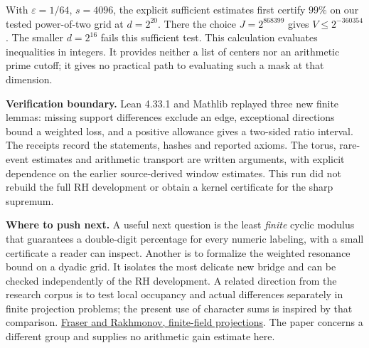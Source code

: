 \documentclass[12pt,letterpaper]{article}
\newcommand{\para}[1]{\par\medskip\noindent\textbf{#1}\quad}
\begin{document}
With \(\varepsilon=1/64\), \(s=4096\), the explicit sufficient estimates first certify \(99\%\) on our tested power-of-two grid at \(d=2^{20}\). There the choice \(J=2^{868399}\) gives \(V\le2^{-360354}\). The smaller \(d=2^{16}\) fails this sufficient test. This calculation evaluates inequalities in integers. It provides neither a list of centers nor an arithmetic prime cutoff; it gives no practical path to evaluating such a mask at that dimension.

\para{Verification boundary.} Lean 4.33.1 and Mathlib replayed three new finite lemmas: missing support differences exclude an edge, exceptional directions bound a weighted loss, and a positive allowance gives a two-sided ratio interval. The receipts record the statements, hashes and reported axioms. The torus, rare-event estimates and arithmetic transport are written arguments, with explicit dependence on the earlier source-derived window estimates. This run did not rebuild the full RH development or obtain a kernel certificate for the sharp supremum.

\para{Where to push next.} A useful next question is the least \emph{finite} cyclic modulus that guarantees a double-digit percentage for every numeric labeling, with a small certificate a reader can inspect. Another is to formalize the weighted resonance bound on a dyadic grid. It isolates the most delicate new bridge and can be checked independently of the RH development. A related direction from the research corpus is to test local occupancy and actual differences separately in finite projection problems; the present use of character sums is inspired by that comparison. \href{https://arxiv.org/abs/2503.15072v1}{Fraser and Rakhmonov, finite-field projections}. The paper concerns a different group and supplies no arithmetic gain estimate here.
\end{document}

